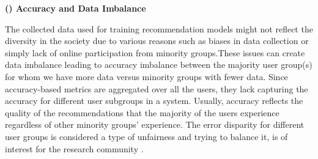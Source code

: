 




\vspace{0.25cm}
\noindent \textbf{() Accuracy and Data Imbalance}
\vspace{0.25cm}

The collected data used for training recommendation models might not reflect the diversity in the society due to various reasons such as biases in data collection or simply lack of online participation from minority groups.These issues can create data imbalance leading to accuracy imbalance between the majority user group(s) for whom we have more data versus minority groups with fewer data. Since accuracy-based metrics are aggregated over all the users, they lack capturing the accuracy for different user subgroups in a system. Usually, accuracy reflects the quality of the recommendations that the majority of the users experience regardless of other minority groups' experience. The error disparity for different user groups is considered a type of unfairness and trying to balance it, is of interest for the research community \cite{ekstrand2018all,yao2017beyond}.


